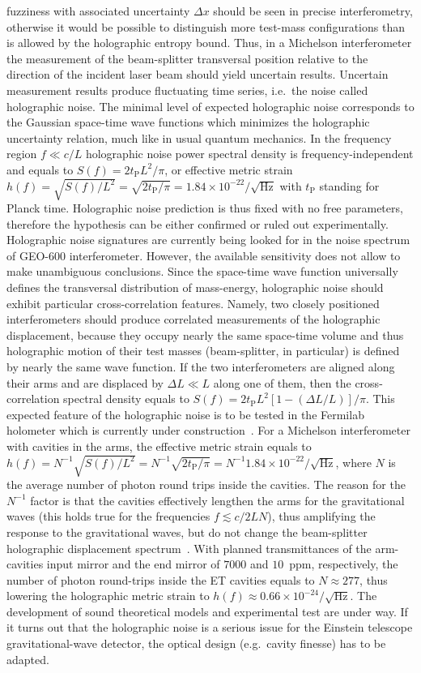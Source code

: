 fuzziness with associated uncertainty $\Delta x$ should be seen in
precise interferometry, otherwise it would be possible to
distinguish more test-mass configurations than is allowed by the
holographic entropy bound. Thus, in a Michelson interferometer
the measurement of the beam-splitter transversal position relative to
the direction of the incident laser beam should yield uncertain
results. Uncertain measurement results produce fluctuating
time series, i.e.\ the noise called holographic noise. The minimal
level of expected holographic noise corresponds to the Gaussian
space-time wave functions which minimizes the holographic
uncertainty relation, much like in usual quantum mechanics. In the
frequency region $f\ll c/L$ holographic noise power spectral
density is frequency-independent and equals to
$S(f)=2t_\textrm{P}L^2/\pi$, or effective metric strain
$h(f)=\sqrt{S(f)/L^2}=\sqrt{2t_\textrm{P}/\pi}=1.84\times10^{-22}/\sqrt{\textrm{
Hz}}$
with $t_\textrm{P}$ standing for Planck time. Holographic noise
prediction is thus fixed with no free parameters, therefore the
hypothesis can be either confirmed or ruled out experimentally.
Holographic noise signatures are currently being looked for in the
noise spectrum of GEO-600 interferometer. However, the available
sensitivity does not allow to make unambiguous conclusions. Since
the space-time wave function universally defines the transversal
distribution of mass-energy, holographic noise should exhibit
particular cross-correlation features. Namely, two closely
positioned interferometers should produce correlated measurements
of the holographic displacement, because they occupy nearly the
same space-time volume and thus holographic motion of their test
masses (beam-splitter, in particular) is defined by nearly the
same wave function. If the two interferometers are aligned along
their arms and are displaced by $\Delta L\ll L$ along one of them,
then the cross-correlation spectral density equals to
$S(f)=2t_\textrm{P}L^2[1-(\Delta L/L)]/\pi$. This expected feature
of the holographic noise is to be tested in the Fermilab holometer
which is currently under construction~\cite{2010_holo_proposal}.
For a Michelson interferometer with cavities in the arms, the
effective metric strain equals to
$h(f)=N^{-1}\sqrt{S(f)/L^2}=N^{-1}\sqrt{2t_\textrm{P}/\pi}=N^{-1}1.84\times10^{
-22}/\sqrt{\textrm{Hz}}$,
where $N$ is the average number of photon round trips inside the
cavities. The reason for the $N^{-1}$ factor is that the cavities
effectively lengthen the arms for the gravitational waves (this
holds true for the frequencies $f\lesssim c/2LN$), thus amplifying
the response to the gravitational waves, but do not change the
beam-splitter holographic displacement spectrum~\cite{2009_holonoise}. With planned transmittances of the
arm-cavities input mirror and the end mirror of $7000$ and $10$~ppm, respectively, the number of photon round-trips inside the ET
cavities equals to $N\approx 277$, thus lowering the holographic
metric strain to
$h(f)\approx0.66\times10^{-24}/\sqrt{\textrm{Hz}}$. The
development of sound theoretical models and experimental test are
under way. If it turns out that the holographic noise is a serious
issue for the Einstein telescope gravitational-wave detector, the
optical design (e.g.\ cavity finesse) has to be adapted. 